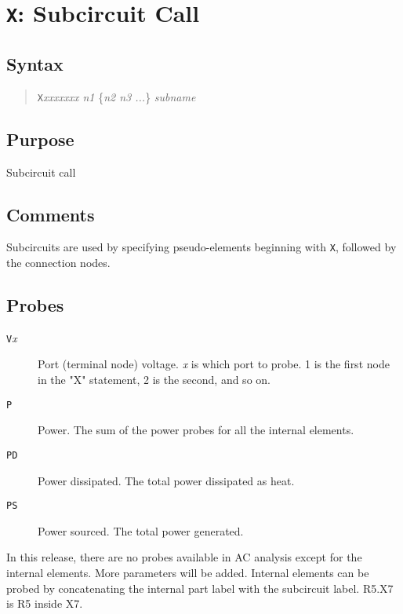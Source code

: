 \section{{\tt X}: Subcircuit Call}
\subsection{Syntax}
\begin{verse}
{\tt X}{\it xxxxxxx n1} \{{\it n2 n3 ...}\} {\it subname}
\end{verse}
\subsection{Purpose}

Subcircuit call
\subsection{Comments}

Subcircuits are used by specifying pseudo-elements beginning with {\tt X},
followed by the connection nodes.
\subsection{Probes}

\begin{description}

\item[{\tt V}{\it x}]  Port (terminal node) voltage.  {\it x} is
which port to probe.  1 is the first node in the "X" statement, 2
is the second, and so on.

\item[{\tt P}] Power.  The sum of the power probes for all the internal elements.

\item[{\tt PD}] Power dissipated.  The total power dissipated as heat.

\item[{\tt PS}] Power sourced.  The total power generated.

\end{description}

In this release, there are no probes available in AC analysis except for the
internal elements.  More parameters will be added.  Internal elements can be
probed by concatenating the internal part label with the subcircuit label.
R5.X7 is R5 inside X7.
